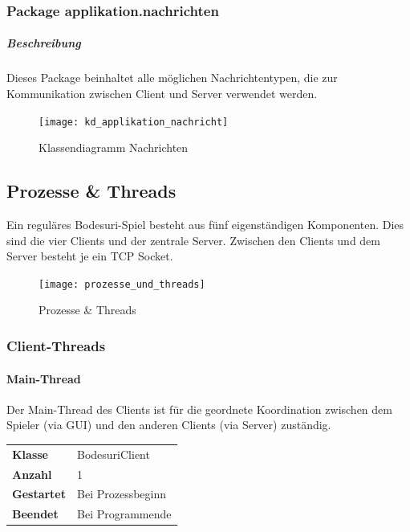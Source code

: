 \documentclass[12pt,halfparskip]{scrartcl}
\begin{document}
\subsubsection{Package applikation.nachrichten}
\label{ssub:package_applikation_nachrichten}
\subparagraph{Beschreibung}
Dieses Package beinhaltet alle möglichen Nachrichtentypen, die zur Kommunikation zwischen Client und Server verwendet werden.
\begin{figure}[h]
	\centering
	\texttt{[image: kd\_applikation\_nachricht]}
	\caption{Klassendiagramm Nachrichten}
	\label{fig:kd_applikation_nachricht}
\end{figure}
\clearpage

\subsection{Prozesse \& Threads}
\label{sub:prozesse_threads}

Ein reguläres Bodesuri-Spiel besteht aus fünf eigenständigen Komponenten. Dies sind die vier Clients und der zentrale Server. Zwischen den Clients und dem Server besteht je ein TCP Socket. 

\begin{figure}[h]
	\centering
	\texttt{[image: prozesse\_und\_threads]}
	\caption{Prozesse \& Threads}
	\label{fig:prozesse_und_threads}
\end{figure}

\clearpage
\subsubsection{Client-Threads}
\label{ssub:client_threads}

\paragraph{Main-Thread}
\label{ssub:main_thread}

Der Main-Thread des Clients ist für die geordnete Koordination zwischen dem Spieler (via GUI) und den anderen Clients (via Server) zuständig.


\begin{tabular}{@{} l p{12.5cm}}
\textbf{Klasse}       & BodesuriClient \\
\textbf{Anzahl}       & 1 \\
\textbf{Gestartet}    & Bei Prozessbeginn \\
\textbf{Beendet}      & Bei Programmende
\end{tabular}
\end{document}
